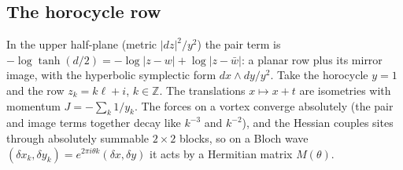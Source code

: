 \documentclass[11pt]{article}
\theoremstyle{definition}
\theoremstyle{remark}
\begin{document}
\subsection{The horocycle row}
In the upper half-plane (metric $|dz|^2/y^2$) the pair term is $-\log\tanh(d/2)=-\log|z-w|+\log|z-\bar w|$: a planar row plus
its mirror image, with the hyperbolic symplectic form $dx\wedge dy/y^2$. Take the horocycle $y=1$ and the row $z_k=k\ell+i$,
$k\in\mathbb Z$. The translations $x\mapsto x+t$ are isometries with momentum $J=-\sum_k1/y_k$. The forces on a vortex converge
absolutely (the pair and image terms together decay like $k^{-3}$ and $k^{-2}$), and the Hessian couples sites through
absolutely summable $2\times2$ blocks, so on a Bloch wave $(\delta x_k,\delta y_k)=e^{2\pi i\theta k}(\delta x,\delta y)$ it
acts by a Hermitian matrix $M(\theta)$.
\end{document}
